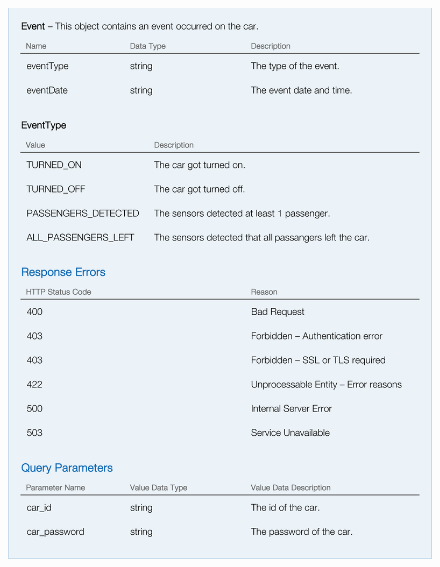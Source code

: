 \begin{figure}[H]
	\noindent
    	\centering
    	\includegraphics{apitables/APIHeartbeat2.png}
    	\label{fig:api-car-heartbeat2}
\end{figure}

